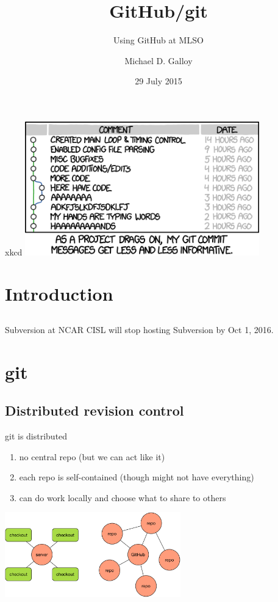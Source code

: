 \documentclass{beamer}
\title{GitHub/git}
\subtitle{Using GitHub at MLSO}
\author{Michael D. Galloy}
\institute[NCAR/MLSO]{NCAR/MLSO}
\date{29 July 2015}
\begin{document}
\begin{frame}{xkcd}
  \includegraphics[width=4in]{git_commit.png}
\end{frame}

\begin{frame}[plain]
  \titlepage
\end{frame}


\section{Introduction}
\subsection*{}

\begin{frame}
  \tableofcontents
\end{frame}

\begin{frame}{Subversion at NCAR}
CISL will stop hosting Subversion by Oct 1, 2016.
\end{frame}


\section{git}

\subsection{Distributed revision control}
\begin{frame}{git is distributed}
  \begin{enumerate}
    \item no central repo (but we can act like it)
    \item each repo is self-contained (though might not have everything)
    \item can do work locally and choose what to share to others
  \end{enumerate}
  \begin{center}
    \includegraphics[width=3in]{drc.pdf}
  \end{center}
\end{frame}
\end{document}
